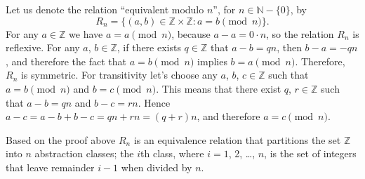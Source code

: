 Let us denote the relation ``equivalent modulo $n$'', for $n\in\mathbb{N}-\{0\}$, by
\[
    R_n = \{(a,b)\in\mathbb{Z}\times\mathbb{Z}: a=b\!\!\!\pmod{n}\}.
\]
For any $a\in\mathbb{Z}$ we have $a=a\pmod{n}$, because $a-a=0\cdot n$, so the relation $R_n$ is reflexive.
For any $a$, $b\in\mathbb{Z}$, if there exists $q\in\mathbb{Z}$ that $a-b=qn$, then $b-a=-qn$, and therefore the fact that $a=b\pmod{n}$ implies $b=a\pmod{n}$.
Therefore, $R_n$ is symmetric.
For transitivity let's choose any $a$, $b$, $c\in\mathbb{Z}$ such that $a=b\pmod{n}$ and $b=c\pmod{n}$.
This means that there exist $q$, $r\in\mathbb{Z}$ such that $a-b=qn$ and $b-c=rn$.
Hence $a-c=a-b+b-c=qn+rn=(q+r)n$, and therefore $a=c\pmod{n}$.

Based on the proof above $R_n$ is an equivalence relation that partitions the set $\mathbb{Z}$ into $n$ abstraction classes;
the $i$th class, where $i=1$, 2, \dots, $n$, is the set of integers that leave remainder $i-1$ when divided by $n$.
